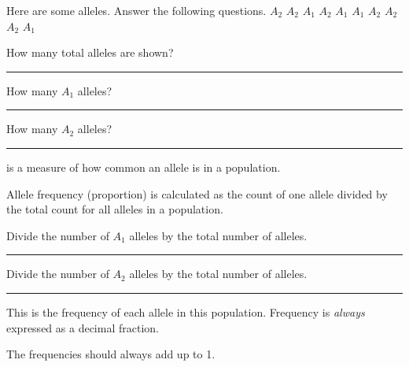\documentclass[t]{beamer}
\begin{document}
%	
%	
%
\begin{frame}{Here are some alleles. Answer the following questions.}
	\hfil $A_2$ \quad $A_2$ \quad $A_1$ \quad $A_2$ \quad $A_1$ \quad $A_1$ \quad $A_2$ \quad $A_2$ \quad $A_2$ \quad $A_1$ \hfil
	
	\vspace*{2\baselineskip}
		
	\hangpara How many total alleles are shown? \rule{0.5in}{0.4pt}
	
	\hangpara How many $A_1$ alleles? \rule{0.5in}{0.4pt}
	
	\hangpara How many $A_2$ alleles? \rule{0.5in}{0.4pt}
	
\end{frame}
%
\begin{frame}[t]{ is a measure of how common an allele is in a population.}
	
	
	\hangpara Allele frequency (proportion) is calculated as the count of one allele divided by the total count for all alleles in a population.
	
	\hangpara Divide the number of $A_1$ alleles by the total number of alleles. \rule{0.5in}{0.4pt}
	
	\hangpara Divide the number of $A_2$ alleles by the total number of alleles. \rule{0.5in}{0.4pt}
	
	\hangpara This is the frequency of each allele in this population. Frequency is \emph{always} expressed as a decimal fraction.
	 
\end{frame}
%
\begin{frame}{The frequencies should always add up to 1.}
	
	
\end{frame}
\end{document}
